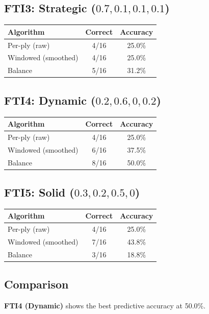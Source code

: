 \documentclass[11pt]{book}
\begin{document}
\subsection{FTI3: Strategic ($0.7, 0.1, 0.1, 0.1$)}

\begin{tabular}{lcc}
\toprule
\textbf{Algorithm} & \textbf{Correct} & \textbf{Accuracy} \\
\midrule
Per-ply (raw) & 4/16 & 25.0\% \\
Windowed (smoothed) & 4/16 & 25.0\% \\
Balance & 5/16 & 31.2\% \\
\bottomrule
\end{tabular}

\subsection{FTI4: Dynamic ($0.2, 0.6, 0, 0.2$)}

\begin{tabular}{lcc}
\toprule
\textbf{Algorithm} & \textbf{Correct} & \textbf{Accuracy} \\
\midrule
Per-ply (raw) & 4/16 & 25.0\% \\
Windowed (smoothed) & 6/16 & 37.5\% \\
Balance & 8/16 & 50.0\% \\
\bottomrule
\end{tabular}

\subsection{FTI5: Solid ($0.3, 0.2, 0.5, 0$)}

\begin{tabular}{lcc}
\toprule
\textbf{Algorithm} & \textbf{Correct} & \textbf{Accuracy} \\
\midrule
Per-ply (raw) & 4/16 & 25.0\% \\
Windowed (smoothed) & 7/16 & 43.8\% \\
Balance & 3/16 & 18.8\% \\
\bottomrule
\end{tabular}

\subsection{Comparison}

\textbf{FTI4 (Dynamic)} shows the best predictive accuracy at 50.0\%.
\end{document}
